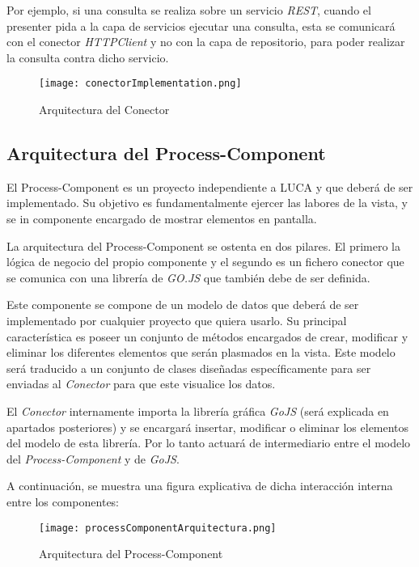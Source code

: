 Por ejemplo, si una consulta se realiza sobre un servicio \emph{REST}, cuando el presenter pida a la capa de servicios ejecutar una consulta, esta se comunicará con el conector \emph{HTTPClient} y no con la capa de repositorio, para poder realizar la consulta contra dicho servicio.

\begin{figure}[!tb]
	\centering
	\texttt{[image: conectorImplementation.png]}
	\caption{Arquitectura del Conector}\label{fig:conectorImplementation}
\end{figure}

\subsection{Arquitectura del Process-Component}

El Process-Component es un proyecto independiente a LUCA y que deberá de ser implementado. Su objetivo es fundamentalmente ejercer las labores de la vista, y se in componente encargado de mostrar elementos en pantalla. 

La arquitectura del Process-Component se ostenta en dos pilares. El primero la lógica de negocio del propio componente y el segundo es un fichero conector que se comunica con una librería de \emph{GO.JS} que también debe de ser definida.

Este componente se compone de un modelo de datos que deberá de ser implementado por cualquier proyecto que quiera usarlo. Su principal característica es poseer un conjunto de métodos encargados de crear, modificar y eliminar los diferentes elementos que serán plasmados en la vista. Este modelo será traducido a un conjunto de clases diseñadas específicamente para ser enviadas al \emph{Conector} para que este visualice los datos.


El \emph{Conector} internamente importa la librería gráfica \emph{GoJS} (será explicada en apartados posteriores) y se encargará insertar, modificar o eliminar los elementos del modelo de esta librería. Por lo tanto actuará de intermediario entre el modelo del \emph{Process-Component} y de \emph{GoJS}.

A continuación, se muestra una figura explicativa de dicha interacción interna entre los componentes:

\begin{figure}[!tb]
	\centering
	\texttt{[image: processComponentArquitectura.png]}
	\caption{Arquitectura del Process-Component}\label{fig:processComponent}
\end{figure}

